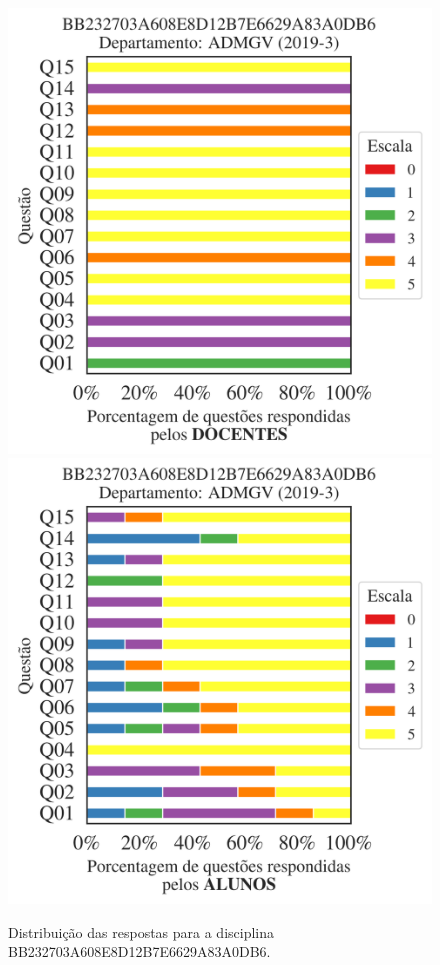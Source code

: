 \documentclass[a4paper,10pt]{article}
\begin{document}
\begin{figure}[h]
\centering
\includegraphics[width=0.485\linewidth]{analise_disciplina_departamento_ADMGV_BB232703A608E8D12B7E6629A83A0DB6_docentes.png}
\includegraphics[width=0.485\linewidth]{analise_disciplina_departamento_ADMGV_BB232703A608E8D12B7E6629A83A0DB6_alunos.png}
\caption{\label{fig:analise_geral_departamento}                Distribuição das respostas para a disciplina BB232703A608E8D12B7E6629A83A0DB6. }
\end{figure}
\end{document}
